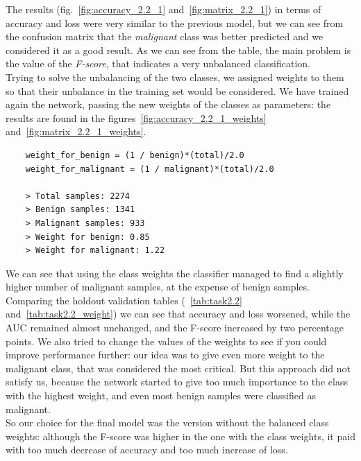 \documentclass[11pt,a4paper,oneside]{article}
\begin{document}
The results (fig.~\ref{fig:accuracy_2.2_1} and~\ref{fig:matrix_2.2_1}) in terms of accuracy and loss were very similar to the previous model, but we can see from the confusion matrix that the \textit{malignant} class was better predicted and we considered it as a good result.
As we can see from the table, the main problem is the value of the \textit{F-score}, that indicates a very unbalanced classification.\\

Trying to solve the unbalancing of the two classes, we assigned weights to them so that their unbalance in the training set would be considered. We have trained again the network, passing the new weights of the classes as parameters: the results are found in the figures~\ref{fig:accuracy_2.2_1_weights} and~\ref{fig:matrix_2.2_1_weights}. 

\begin{verbatim}
    weight_for_benign = (1 / benign)*(total)/2.0 
    weight_for_malignant = (1 / malignant)*(total)/2.0
    
    > Total samples: 2274
    > Benign samples: 1341
    > Malignant samples: 933
    > Weight for benign: 0.85
    > Weight for malignant: 1.22
\end{verbatim}

\clearpage

We can see that using the class weights the classifier managed to find a slightly higher number of malignant samples, at the expense of benign samples. Comparing the holdout validation tables (~\ref{tab:task2.2} and~\ref{tab:task2.2_weight}) we can see that accuracy and loss worsened, while the AUC remained almost unchanged, and the F-score increased by two percentage points. 
We also tried to change the values of the weights to see if you could improve performance further: our idea was to give even more weight to the malignant class, that was considered the most critical. But this approach did not satisfy us, because the network started to give too much importance to the class with the highest weight, and even most benign samples were classified as malignant. \\

So our choice for the final model was the version without the balanced class weights: although the F-score was higher in the one with the class weights, it paid with too much decrease of accuracy and too much increase of loss.
\end{document}
